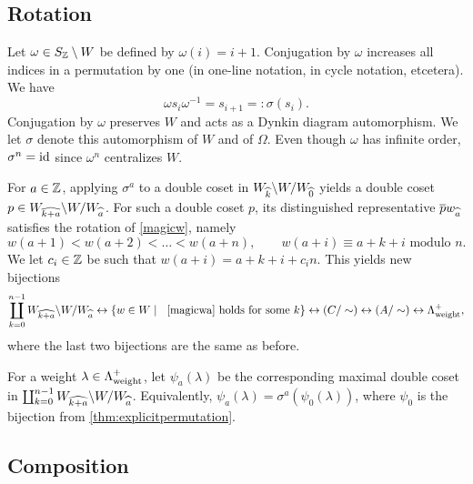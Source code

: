 \subsection{Rotation}\label{subsec rotation}

Let $\omega \in S_{\mathbb{Z}} \setminus W$ be defined by $\omega(i) = i+1$. Conjugation by $\omega$ increases all indices in a permutation by one (in one-line notation, in cycle notation, etcetera). We have
\begin{equation} \omega s_i \omega^{-1} = s_{i+1} =: \sigma(s_i). \end{equation}
Conjugation by $\omega$ preserves $W$ and acts as a Dynkin diagram automorphism. We let $\sigma$ denote this automorphism of $W$ and of $\Omega$. Even though $\omega$ has infinite order, $\sigma^n = \operatorname{id}$ since $\omega^n$ centralizes $W$.

For $a \in \mathbb{Z}$, applying $\sigma^a$ to a double coset in $W_{\widehat{k}} \backslash W / W_{\widehat{0}}$ yields a double coset $p \in W_{\widehat{k+a}} \backslash W / W_{\widehat{a}}$. For such a double coset $p$, its distinguished representative $\overline{p} w_{\widehat{a}}$ satisfies the rotation of \eqref{magicw}, namely
\begin{equation} \label{magicwa} w(a+1) < w(a+2) < \ldots < w(a+n), \qquad w(a+i) \equiv a+ k + i \text{ modulo } n.\end{equation} We let $c_i \in \mathbb{Z}$ be such that $w(a+ i) = a + k + i + c_i n$. This yields new bijections
\begin{equation} \label{bijectionsa} \coprod_{k=0}^{n-1} W_{\widehat{k+a}} \backslash W / W_{\widehat{a}} \leftrightarrow \{w \in W \mid \; \text{ \eqref{magicwa} holds for some } k \} \leftrightarrow (C/\sim) \leftrightarrow (A/\sim) \leftrightarrow \Lambda^+_{\operatorname{weight}}, \end{equation}
where the last two bijections are the same as before.

\begin{defn}\label{def:psia} For a weight $\lambda \in \Lambda^+_{\operatorname{weight}}$, let $\psi_a(\lambda)$ be the corresponding maximal double coset in $\coprod_{k=0}^{n-1} W_{\widehat{k+a}} \backslash W / W_{\widehat{a}}$. Equivalently, $\psi_a(\lambda) = \sigma^a(\psi_0(\lambda))$, where $\psi_0$ is the bijection from \cref{thm:explicitpermutation}. \end{defn}

\subsection{Composition} \label{subsec:cosetcomp}

